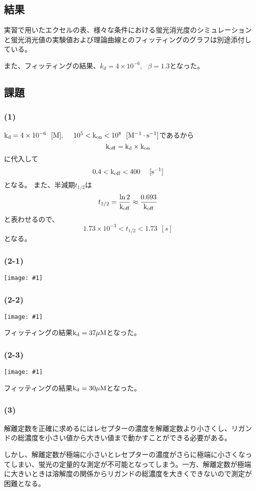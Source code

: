 \documentclass[a4paper,papersize,dvipdfmx]{jsarticle}
\newcommand{\pict}[2]{\begin{center} \texttt{[image: \#1]} \end{center}}   %
\begin{document}
\subsection*{結果}
実習で用いたエクセルの表、様々な条件における蛍光消光度のシミュレーションと蛍光消光値の実験値および理論曲線とのフィッティングのグラフは別途添付している。

また、フィッティングの結果、$k_d = 4\times 10 ^{-6}, \ \ \ \beta = 1.3$となった。

\subsection*{課題}

\subsubsection*{(1)}
$\rm k_d = 4\times 10 ^{-6} \ \  [M], \ \ \ \ 10^5 < k_{on} < 10^8 \ \  [M^{-1} \cdot s^{-1}]$であるから
\[\rm k_{off} = k_d \times k_{on}\]
に代入して
\[\rm 0.4 < k_{off} < 400  \ \ \ \ [s^{-1}]\]
となる。
また、半減期$t_{1/2}$は
\[t_{1/2} = \frac{\ln 2}{\rm{k_{off}}} \approx \frac{0.693}{\rm{k_{off}}}\]
と表わせるので、
\[ 1.73 \times 10^{-3} < t_{1/2} < 1.73 \ \ [s]\]
となる。

\subsubsection*{(2-1)}
\pict{imgs/g1.png}{10}

\subsubsection*{(2-2)}
\pict{imgs/g2.png}{10}
フィッティングの結果$\rm k_d = 37 \mu M$となった。

\subsubsection*{(2-3)}
\pict{imgs/g3.png}{10}
フィッティングの結果$\rm k_d = 30 \mu M$となった。

\subsubsection*{(3)}
解離定数を正確に求めるにはレセプターの濃度を解離定数より小さくし、リガンドの総濃度を小さい値から大きい値まで動かすことができる必要がある。

しかし、解離定数が極端に小さいとレセプターの濃度がさらに極端に小さくなってしまい、蛍光の定量的な測定が不可能となってしまう。一方、解離定数が極端に大きいときは溶解度の関係からリガンドの総濃度を大きくできないので測定が困難となる。
\end{document}
